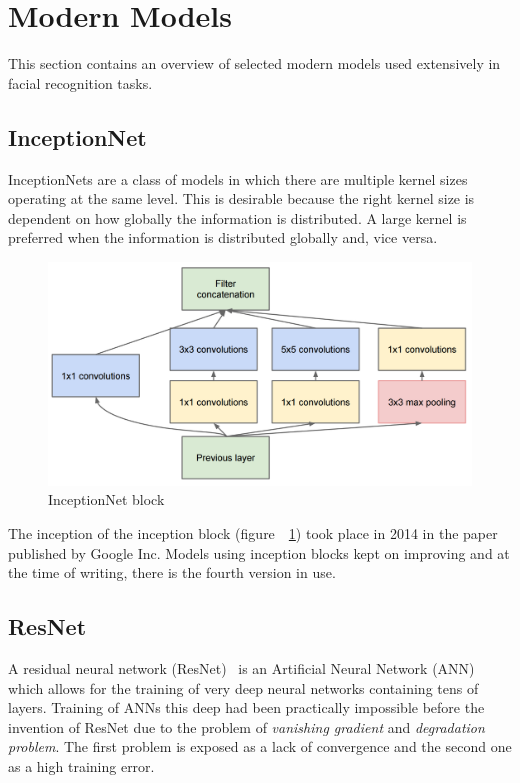 \section{Modern Models}\label{sec:models}
This section contains an overview of selected modern models used extensively in facial recognition tasks.

\subsection{InceptionNet}\label{subsec:inceptionnet}
InceptionNets are a class of models in which there are multiple kernel sizes operating at the same level.
This is desirable because the right kernel size is dependent on how globally the information is distributed.
A large kernel is preferred when the information is distributed globally and, vice versa.

\begin{figure}[H]
    \centering
    \includegraphics[width=0.9\columnwidth]{images/face-recognition/inceptionnet.png}
    \caption{InceptionNet block~\cite{GoingDeeper}}
    \label{fig:InceptionNet}
\end{figure}

The inception of the inception block (figure~~\ref{fig:InceptionNet}) took place in 2014 in the paper~\cite{GoingDeeper}
published by Google Inc.
Models using inception blocks kept on improving and at the time of writing, there is the fourth version in use.

\subsection{ResNet}\label{subsec:resnet}
A residual neural network (ResNet)~\cite{ResNet} is an Artificial Neural Network (ANN) which allows for the training of
very deep neural networks containing tens of layers.
Training of ANNs this deep had been practically impossible before the invention of ResNet due to the problem of
\textit{vanishing gradient} and \textit{degradation problem}.
The first problem is exposed as a lack of convergence and the second one as a high training error.


